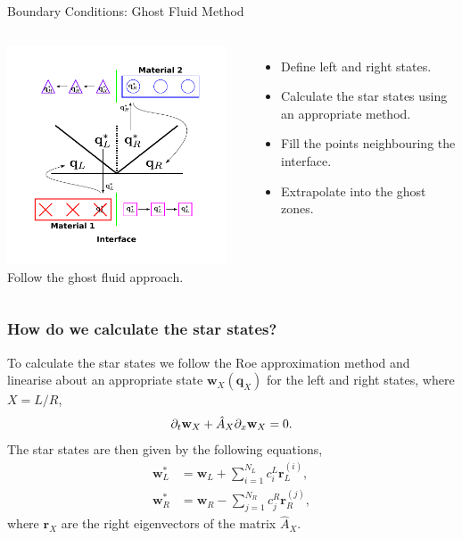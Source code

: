 \documentclass{beamer}
\begin{document}
\begin{frame}{Boundary Conditions: Ghost Fluid Method}
\begin{columns}
\column{6.5cm}
\centering
\includegraphics[width=6.5cm]{../images/multimodel_roe}
\column{4.5cm}
Follow the ghost fluid approach.
\begin{itemize}
\item{Define left and right states.}
\item{Calculate the star states using an appropriate method.}
\item{Fill the points neighbouring the interface.}
\item{Extrapolate into the ghost zones.}
\end{itemize}
\end{columns}
\end{frame}

\begin{frame}
\frametitle{How do we calculate the star states?}
To calculate the star states we follow the Roe approximation method and linearise about an appropriate state $\mathbf{w}_X(\mathbf{q}_X)$ for the left and right states, where $X = L/R$,
\begin{equation}
\partial_t\mathbf{w}_X + \hat{A}_X\partial_{\mathnormal{x}}\mathbf{w}_X = 0.
\end{equation}
The star states are then given by the following equations,
\begin{align}
\mathbf{w}^*_L &= \mathbf{w}_L+\sum^{N_L}_{i=1}c^L_{i}\mathbf{r}^{(i)}_L,\\
\mathbf{w}^*_R &= \mathbf{w}_R-\sum^{N_R}_{j=1}c^R_{j}\mathbf{r}^{(j)}_R,
\end{align}
where $\mathbf{r}_X$ are the right eigenvectors of the matrix $\hat{A}_X$.
\end{frame}
\end{document}
